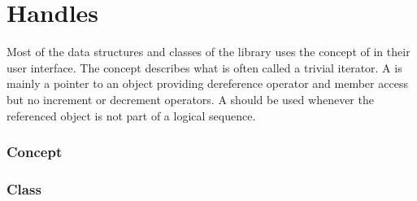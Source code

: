 
\chapter{Handles}

Most of the data structures and classes of the \cgal library
uses the concept of  in their user interface.
The concept  describes what is    often called 
a trivial iterator.  
A  is
mainly   a pointer to an object providing 
dereference operator  and 
member access  but no increment or decrement 
operators.
A   should be used whenever the referenced
object
is not part of a logical sequence.
 
\subsection*{Concept}

\subsection*{Class}
